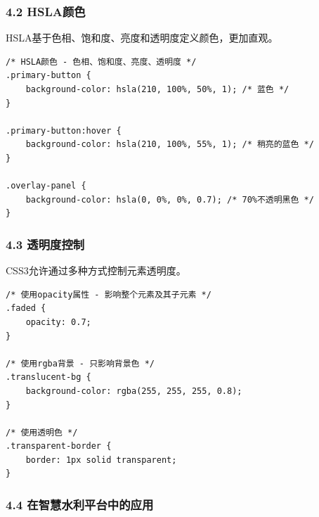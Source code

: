 \subsubsection{4.2 HSLA颜色}\label{hslaux989cux8272}

HSLA基于色相、饱和度、亮度和透明度定义颜色，更加直观。

\begin{lstlisting}
/* HSLA颜色 - 色相、饱和度、亮度、透明度 */
.primary-button {
    background-color: hsla(210, 100%, 50%, 1); /* 蓝色 */
}

.primary-button:hover {
    background-color: hsla(210, 100%, 55%, 1); /* 稍亮的蓝色 */
}

.overlay-panel {
    background-color: hsla(0, 0%, 0%, 0.7); /* 70%不透明黑色 */
}
\end{lstlisting}

\subsubsection{4.3 透明度控制}\label{ux900fux660eux5ea6ux63a7ux5236}

CSS3允许通过多种方式控制元素透明度。

\begin{lstlisting}
/* 使用opacity属性 - 影响整个元素及其子元素 */
.faded {
    opacity: 0.7;
}

/* 使用rgba背景 - 只影响背景色 */
.translucent-bg {
    background-color: rgba(255, 255, 255, 0.8);
}

/* 使用透明色 */
.transparent-border {
    border: 1px solid transparent;
}
\end{lstlisting}

\subsubsection{4.4
在智慧水利平台中的应用}\label{ux5728ux667aux6167ux6c34ux5229ux5e73ux53f0ux4e2dux7684ux5e94ux7528-5}

